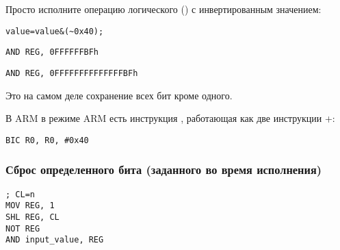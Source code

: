 Просто исполните операцию логического  (\AND) с инвертированным значением:

\begin{lstlisting}[caption=\CCpp,style=customc]
value=value&(~0x40);
\end{lstlisting}

\begin{lstlisting}[caption=x86,style=customasmx86]
AND REG, 0FFFFFFBFh
\end{lstlisting}

\begin{lstlisting}[caption=x64,style=customasmx86]
AND REG, 0FFFFFFFFFFFFFFBFh
\end{lstlisting}

Это на самом деле сохранение всех бит кроме одного.

В ARM в режиме ARM есть инструкция \BIC, работающая как две инструкции \NOT+\AND:

\begin{lstlisting}[caption=ARM (\ARMMode),style=customasmARM]
BIC R0, R0, #0x40
\end{lstlisting}

\subsubsection{Сброс определенного бита (заданного во время исполнения)}



\begin{lstlisting}[caption=x86,style=customasmx86]
; CL=n
MOV REG, 1
SHL REG, CL
NOT REG
AND input_value, REG
\end{lstlisting}
